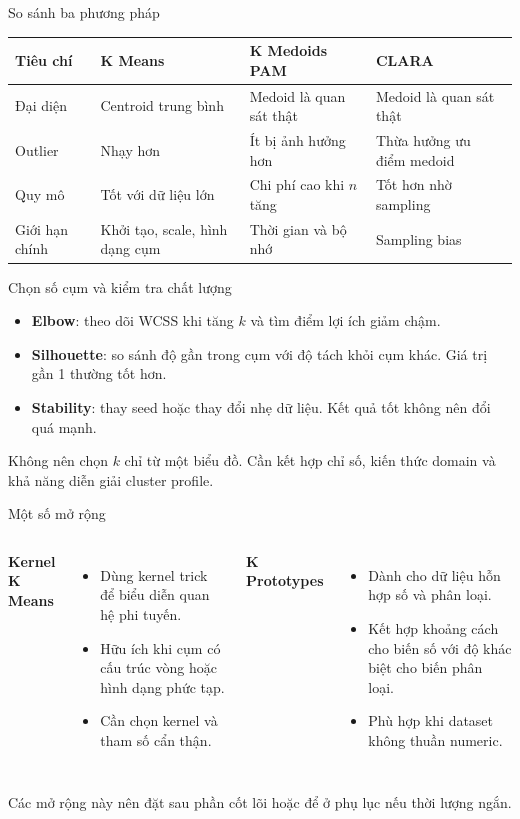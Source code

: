 \documentclass[aspectratio=169,11pt]{beamer}
\begin{document}
\begin{frame}{So sánh ba phương pháp}
\centering
\small
\begin{tabular}{p{}p{}p{}p{}}
\toprule
\textbf{Tiêu chí} & \textbf{K Means} & \textbf{K Medoids PAM} & \textbf{CLARA}\\
\midrule
Đại diện & Centroid trung bình & Medoid là quan sát thật & Medoid là quan sát thật\\
Outlier & Nhạy hơn & Ít bị ảnh hưởng hơn & Thừa hưởng ưu điểm medoid\\
Quy mô & Tốt với dữ liệu lớn & Chi phí cao khi $n$ tăng & Tốt hơn nhờ sampling\\
Giới hạn chính & Khởi tạo, scale, hình dạng cụm & Thời gian và bộ nhớ & Sampling bias\\
\bottomrule
\end{tabular}
\normalsize
\end{frame}

\begin{frame}{Chọn số cụm và kiểm tra chất lượng}
\begin{itemize}
  \item \textbf{Elbow}: theo dõi WCSS khi tăng $k$ và tìm điểm lợi ích giảm chậm.
  \item \textbf{Silhouette}: so sánh độ gần trong cụm với độ tách khỏi cụm khác. Giá trị gần 1 thường tốt hơn.
  \item \textbf{Stability}: thay seed hoặc thay đổi nhẹ dữ liệu. Kết quả tốt không nên đổi quá mạnh.
\end{itemize}
\vspace{0.4em}
Không nên chọn $k$ chỉ từ một biểu đồ. Cần kết hợp chỉ số, kiến thức domain và khả năng diễn giải cluster profile.
\end{frame}

\begin{frame}{Một số mở rộng}
\begin{columns}[T]
\textbf{Kernel K Means}
\begin{itemize}
  \item Dùng kernel trick để biểu diễn quan hệ phi tuyến.
  \item Hữu ích khi cụm có cấu trúc vòng hoặc hình dạng phức tạp.
  \item Cần chọn kernel và tham số cẩn thận.
\end{itemize}
\textbf{K Prototypes}
\begin{itemize}
  \item Dành cho dữ liệu hỗn hợp số và phân loại.
  \item Kết hợp khoảng cách cho biến số với độ khác biệt cho biến phân loại.
  \item Phù hợp khi dataset không thuần numeric.
\end{itemize}
\end{columns}
\vspace{0.5em}
Các mở rộng này nên đặt sau phần cốt lõi hoặc để ở phụ lục nếu thời lượng ngắn.
\end{frame}
\end{document}
